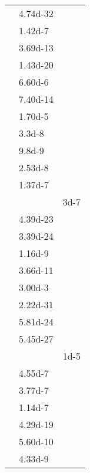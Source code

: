 \documentclass[a4paper, 10pt]{article}
\begin{document}
\begin{small}
\begin{supertabular}{lll}
                   & \num{4.74d-32}  & \\
                       & \num{1.42d-7}   & \\
                    & \num{3.69d-13}  & \\
                     & \num{1.43d-20}  & \\
                       & \num{6.60d-6}   & \\
                       & \num{7.40d-14}  & \\
                       & \num{1.70d-5}   & \\
                        & \num{3.3d-8}    & \\
                        & \num{9.8d-9}    & \\
                       & \num{2.53d-8}   & \\
                      & \num{1.37d-7}   & \\
                         &                 & \num{3d-7} \\
                    & \num{4.39d-23}  & \\
                     & \num{3.39d-24}  & \\
                    & \num{1.16d-9}   & \\
                       & \num{3.66d-11}  & \\
                      & \num{3.00d-3}   & \\
                     & \num{2.22d-31}  & \\
                        & \num{5.81d-24}  & \\
                     & \num{5.45d-27}  & \\
                         &                 & \num{1d-5} \\
               & \num{4.55d-7}   & \\
                & \num{3.77d-7}   & \\
                    & \num{1.14d-7}   & \\
                  & \num{4.29d-19}  & \\
                       & \num{5.60d-10}  & \\
                        & \num{4.33d-9}   & \\

\end{supertabular}
\end{small}
\end{document}
